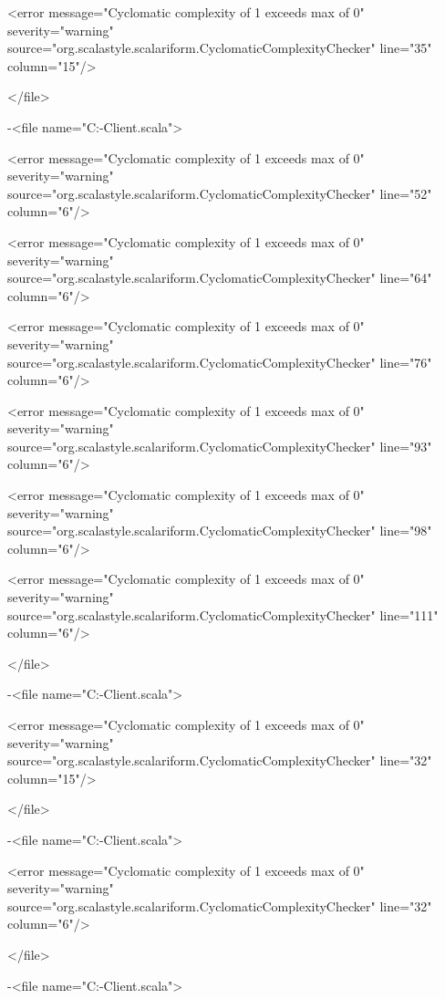 \documentclass{scalatekids-article}
\begin{document}
<error message="Cyclomatic complexity of 1 exceeds max of 0" severity="warning" source="org.scalastyle.scalariform.CyclomaticComplexityChecker" line="35" column="15"/>

</file>


-<file name="C:\Users\Davide\Documents\GitHub\Actorbase-Client\src\main\scala\com\actorbase\driver\data\Serializer.scala">

<error message="Cyclomatic complexity of 1 exceeds max of 0" severity="warning" source="org.scalastyle.scalariform.CyclomaticComplexityChecker" line="52" column="6"/>

<error message="Cyclomatic complexity of 1 exceeds max of 0" severity="warning" source="org.scalastyle.scalariform.CyclomaticComplexityChecker" line="64" column="6"/>

<error message="Cyclomatic complexity of 1 exceeds max of 0" severity="warning" source="org.scalastyle.scalariform.CyclomaticComplexityChecker" line="76" column="6"/>

<error message="Cyclomatic complexity of 1 exceeds max of 0" severity="warning" source="org.scalastyle.scalariform.CyclomaticComplexityChecker" line="93" column="6"/>

<error message="Cyclomatic complexity of 1 exceeds max of 0" severity="warning" source="org.scalastyle.scalariform.CyclomaticComplexityChecker" line="98" column="6"/>

<error message="Cyclomatic complexity of 1 exceeds max of 0" severity="warning" source="org.scalastyle.scalariform.CyclomaticComplexityChecker" line="111" column="6"/>

</file>


-<file name="C:\Users\Davide\Documents\GitHub\Actorbase-Client\src\main\scala\com\actorbase\cli\models\ChangePasswordCommand.scala">

<error message="Cyclomatic complexity of 1 exceeds max of 0" severity="warning" source="org.scalastyle.scalariform.CyclomaticComplexityChecker" line="32" column="15"/>

</file>


-<file name="C:\Users\Davide\Documents\GitHub\Actorbase-Client\src\main\scala\com\actorbase\cli\models\Command.scala">

<error message="Cyclomatic complexity of 1 exceeds max of 0" severity="warning" source="org.scalastyle.scalariform.CyclomaticComplexityChecker" line="32" column="6"/>

</file>


-<file name="C:\Users\Davide\Documents\GitHub\Actorbase-Client\src\main\scala\com\actorbase\cli\views\PromptProvider.scala">
\end{document}
